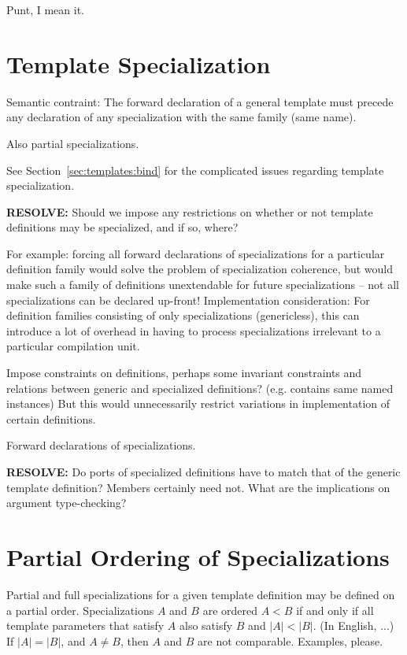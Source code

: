 Punt, I mean it.

\section{Template Specialization}
\label{sec:templates:spec}

Semantic contraint:
The forward declaration of a general template must precede any declaration
of any specialization with the same family (same name).  

Also partial specializations.  

See Section~\ref{sec:templates:bind} for the complicated issues regarding
template specialization.  

\textbf{RESOLVE:}
Should we impose any restrictions on whether or not template definitions
may be specialized, and if so, where?  

For example: forcing all forward declarations of specializations for 
a particular definition family would solve the problem of 
specialization coherence, but would make such a family of definitions
unextendable for future specializations -- not all specializations
can be declared up-front!  
Implementation consideration:
For definition families consisting of only specializations (genericless),
this can introduce a lot of overhead in having to process specializations
irrelevant to a particular compilation unit.  

Impose constraints on definitions, perhaps some invariant constraints and
relations between generic and specialized definitions?  (e.g. contains same
named instances)  But this would unnecessarily restrict variations in
implementation of certain definitions.  

Forward declarations of specializations.  

\textbf{RESOLVE:}
Do ports of specialized definitions have to match that of the 
generic template definition?  Members certainly need not.  
What are the implications on argument type-checking?

\section{Partial Ordering of Specializations}
\label{sec:templates:partialorder}

Partial and full specializations for a given template definition
may be defined on a partial order.  
Specializations $A$ and $B$ are ordered $A < B$ if and only if
all template parameters that satisfy $A$ also satisfy $B$ and $|A| < |B|$.  
(In English, ...)
If $|A| = |B|$, and $A \neq B$, then $A$ and $B$ are not comparable.  
Examples, please.  

